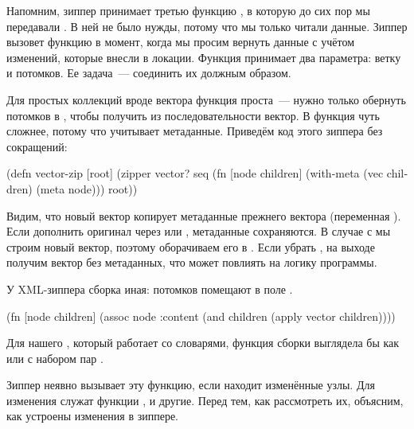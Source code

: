 
Напомним, зиппер принимает третью функцию , в которую до сих пор мы
передавали . В ней не было нужды, потому что мы только читали
данные. Зиппер вызовет функцию в момент, когда мы просим вернуть данные с учётом
изменений, которые внесли в локации. Функция принимает два параметра: ветку и
потомков. Ее задача~--- соединить их должным образом.

Для простых коллекций вроде вектора функция проста~--- нужно только обернуть
потомков в , чтобы получить из последовательности вектор. В 
функция чуть сложнее, потому что учитывает метаданные. Приведём код этого
зиппера без сокращений:


\begin{english}
  \begin{clojure/lines}
(defn vector-zip
  [root]
  (zipper vector?
          seq
          (fn [node children]
            (with-meta (vec children) (meta node)))
          root))
  \end{clojure/lines}
\end{english}

Видим, что новый вектор  копирует метаданные прежнего вектора
(переменная ). Если дополнить оригинал через  или
, метаданные сохраняются. В случае с  мы строим
новый вектор, поэтому оборачиваем его в . Если убрать
, на выходе получим вектор без метаданных, что может повлиять на
логику программы.

У XML-зиппера сборка иная: потомков помещают в поле .

\begin{english}
  \begin{clojure}
(fn [node children]
  (assoc node :content
              (and children (apply vector children))))
  \end{clojure}
\end{english}

Для нашего , который работает со словарями, функция сборки выглядела бы
как  или  с набором пар .


Зиппер неявно вызывает эту функцию, если находит изменённые узлы. Для изменения
служат функции ,  и другие. Перед тем, как рассмотреть
их, объясним, как устроены изменения в зиппере.

